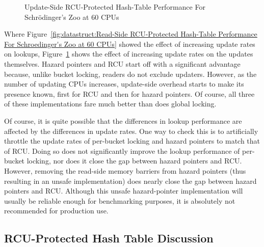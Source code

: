 \begin{figure}[tb]
\centering
{}
\caption{Update-Side RCU-Protected Hash-Table Performance For Schr\"odinger's Zoo at 60 CPUs}
\label{fig:datastruct:Update-Side RCU-Protected Hash-Table Performance For Schroedinger's Zoo at 60 CPUs}
\end{figure}

Where
Figure~\ref{fig:datastruct:Read-Side RCU-Protected Hash-Table Performance For Schroedinger's Zoo at 60 CPUs}
showed the effect of increasing update rates on lookups,
Figure~\ref{fig:datastruct:Update-Side RCU-Protected Hash-Table Performance For Schroedinger's Zoo at 60 CPUs}
shows the effect of increasing update rates on the updates themselves.
Hazard pointers and RCU start off with a significant advantage because,
unlike bucket locking, readers do not exclude updaters.
However, as the number of updating CPUs increases, update-side overhead
starts to make its presence known, first for RCU and then for hazard
pointers.
Of course, all three of these implementations fare much better than does
global locking.

Of course, it is quite possible that the differences in lookup performance
are affected by the differences in update rates.
One way to check this is to artificially throttle the update rates of
per-bucket locking and hazard pointers to match that of RCU.
Doing so does not significantly improve the lookup performance of
per-bucket locking, nor does it close the gap between hazard pointers
and RCU.
However, removing the read-side memory barriers from hazard pointers
(thus resulting in an unsafe implementation) does nearly close the gap
between hazard pointers and RCU.
Although this unsafe hazard-pointer implementation will
usually be reliable enough for benchmarking purposes, it is absolutely
not recommended for production use.

\QuickQuizEnd

\subsection{RCU-Protected Hash Table Discussion}
\label{sec:datastruct:RCU-Protected Hash Table Discussion}

